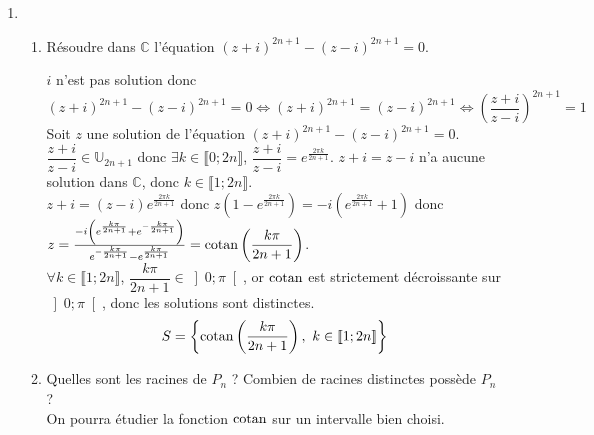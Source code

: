 \documentclass[a4paper,french,bookmarks]{article}
\def\cotan{\qopname\relax o{cotan}}
\begin{document}
\begin{enumerate}
\begin{tcolorbox}[colback=black!8,colframe=black!9,boxrule=.25pt,enhanced,arc is angular,arc=0pt]
\begin{align*}
          &= \dfrac{1}{2i}\left[ 2i\sum_{p=0}^{n}\binom{2n+1}{2k+1}\left(X^2\right)^{n-p}(-1)^p\right]\\
          &= \sum_{p=0}^{n}\binom{2n+1}{2n+1-2k}\left(X^2\right)^{p}(-1)^{n-p}\\
          &= \sum_{p=0}^{n}\binom{2n+1}{2p}(-1)^{n-p}\left(X^2\right)^{p}
     \end{align*}
     Donc $P_n$ est un polynôme à coefficients réels, tel que $P_n(X) = Q_n(X^2)$ avec $\displaystyle Q_n(X) = \sum_{p=0}^n a_pX^p$.\\
     On a également $a_p = \binom{2n+1}{2p}(-1)^{n-p}$.
    \end{tcolorbox}
    \item \begin{enumerate}
        \item Résoudre dans $\mathbb{C}$ l'équation $(z+i)^{2n+1}-(z-i)^{2n+1}=0$.
        \begin{tcolorbox}[colback=black!8,colframe=black!9,boxrule=.25pt,enhanced,arc is angular,arc=0pt]
        $i$ n'est pas solution donc $(z+i)^{2n+1}-(z-i)^{2n+1}=0 \iff (z+i)^{2n+1}=(z-i)^{2n+1}\iff \left(\dfrac{z+i}{z-i}\right)^{2n+1} = 1$\\
        Soit $z$ une solution de l'équation $(z+i)^{2n+1}-(z-i)^{2n+1}=0$. $\dfrac{z+i}{z-i} \in \mathbb{U}_{2n+1}$ donc $\exists k \in \llbracket0;2n\rrbracket$, $\dfrac{z+i}{z-i} = e^{\frac{2\pi k}{2n+1}}$.
        $z+i=z-i$ n'a aucune solution dans $\mathbb{C}$, donc $k \in \llbracket1;2n\rrbracket$.\\
        $z+i=(z-i)e^{\frac{2\pi k}{2n+1}}$ donc $z\left(1-e^{\frac{2\pi k}{2n+1}}\right) = -i\left(e^{\frac{2\pi k}{2n+1}}+1\right)$ donc $z = \frac{-i\left(e^{\frac{k\pi}{2n+1}}+e^{-\frac{k\pi}{2n+1}}\right)}{e^{-\frac{k\pi}{2n+1}}-e^{\frac{k\pi}{2n+1}}}=\cotan\left(\dfrac{k\pi}{2n+1}\right)$.\\
        $\forall k \in \llbracket1;2n\rrbracket$, $\dfrac{k\pi}{2n+1} \in \left]0;\pi\right[$, or $\cotan$ est strictement décroissante sur $\left]0;\pi\right[$, donc les solutions sont distinctes.\\
        \[S = \left\lbrace\cotan\left(\dfrac{k\pi}{2n+1}\right) , \  k \in \llbracket1;2n\rrbracket \right\rbrace\]
        \end{tcolorbox}
        \item Quelles sont les racines de $P_n$ ? Combien de racines distinctes possède $P_n$ ?\\
        On pourra étudier la fonction $\cotan$ sur un intervalle bien choisi.

\end{enumerate}
\end{enumerate}
\end{document}
